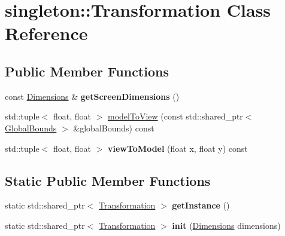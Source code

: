 \hypertarget{classsingleton_1_1_transformation}{}\section{singleton\+:\+:Transformation Class Reference}
\label{classsingleton_1_1_transformation}
\subsection*{Public Member Functions}
\begin{DoxyCompactItemize}
\item 
\mbox{\label{classsingleton_1_1_transformation_a45a811840e91388f25054019c28a27cd}} 
const \hyperlink{struct_dimentions}{Dimensions} \& {\bfseries get\+Screen\+Dimensions} ()
\item 
std\+::tuple$<$ float, float $>$ \hyperlink{classsingleton_1_1_transformation_a4db8bb77746a79641a057c19b30785c6}{model\+To\+View} (const std\+::shared\+\_\+ptr$<$ \hyperlink{struct_global_bounds}{Global\+Bounds} $>$ \&global\+Bounds) const
\item 
\mbox{\label{classsingleton_1_1_transformation_afc296e4278c48d0ab5345192e189669e}} 
std\+::tuple$<$ float, float $>$ {\bfseries view\+To\+Model} (float x, float y) const
\end{DoxyCompactItemize}
\subsection*{Static Public Member Functions}
\begin{DoxyCompactItemize}
\item 
\mbox{\label{classsingleton_1_1_transformation_ab4f0dbbfe1889d5c9f1b70131ba640d5}} 
static std\+::shared\+\_\+ptr$<$ \hyperlink{classsingleton_1_1_transformation}{Transformation} $>$ {\bfseries get\+Instance} ()
\item 
\mbox{\label{classsingleton_1_1_transformation_acef1b7fefa4473eaa785eb42b8ae6066}} 
static std\+::shared\+\_\+ptr$<$ \hyperlink{classsingleton_1_1_transformation}{Transformation} $>$ {\bfseries init} (\hyperlink{struct_dimentions}{Dimensions} dimensions)
\end{DoxyCompactItemize}


